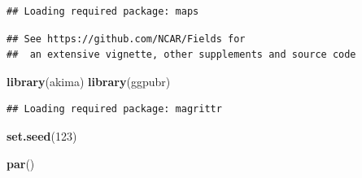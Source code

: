 \documentclass[
]{article}
\newenvironment{Shaded}{\begin{snugshade}}{\end{snugshade}}
\newcommand{\DecValTok}[1]{\textcolor[rgb]{0.00,0.00,0.81}{#1}}
\newcommand{\KeywordTok}[1]{\textcolor[rgb]{0.13,0.29,0.53}{\textbf{#1}}}
\newcommand{\NormalTok}[1]{#1}
\begin{document}
\begin{verbatim}
## Loading required package: maps
\end{verbatim}

\begin{verbatim}
## See https://github.com/NCAR/Fields for
##  an extensive vignette, other supplements and source code
\end{verbatim}

\begin{Shaded}
\begin{Highlighting}[]
\KeywordTok{library}\NormalTok{(akima)}
\KeywordTok{library}\NormalTok{(ggpubr)}
\end{Highlighting}
\end{Shaded}

\begin{verbatim}
## Loading required package: magrittr
\end{verbatim}

\begin{Shaded}
\begin{Highlighting}[]
\KeywordTok{set.seed}\NormalTok{(}\DecValTok{123}\NormalTok{)}

\KeywordTok{par}\NormalTok{()}
\end{Highlighting}
\end{Shaded}
\end{document}
